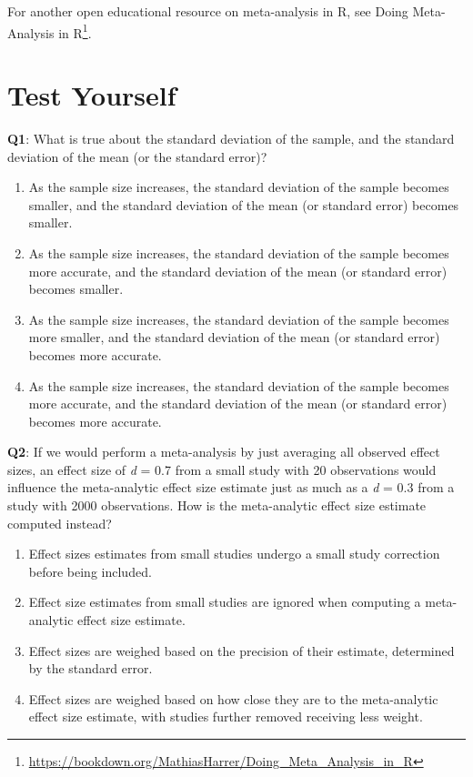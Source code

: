 \documentclass[
  oneside]{krantz}
\providecommand{\tightlist}{%
  \setlength{\itemsep}{0pt}\setlength{\parskip}{0pt}}
\renewcommand{\href}[2]{#2\footnote{\url{#1}}}
\begin{document}
For another open educational resource on meta-analysis in R, see \href{https://bookdown.org/MathiasHarrer/Doing_Meta_Analysis_in_R}{Doing Meta-Analysis in R}.

\hypertarget{test-yourself-9}{%
\section{Test Yourself}\label{test-yourself-9}}

\textbf{Q1}: What is true about the standard deviation of the sample, and the standard deviation of the mean (or the standard error)?

\begin{enumerate}
\def\labelenumi{\Alph{enumi})}
\tightlist
\item
  As the sample size increases, the standard deviation of the sample becomes smaller, and the standard deviation of the mean (or standard error) becomes smaller.
\item
  As the sample size increases, the standard deviation of the sample becomes more accurate, and the standard deviation of the mean (or standard error) becomes smaller.
\item
  As the sample size increases, the standard deviation of the sample becomes more smaller, and the standard deviation of the mean (or standard error) becomes more accurate.
\item
  As the sample size increases, the standard deviation of the sample becomes more accurate, and the standard deviation of the mean (or standard error) becomes more accurate.
\end{enumerate}

\textbf{Q2}: If we would perform a meta-analysis by just averaging all observed effect sizes, an effect size of \emph{d} = 0.7 from a small study with 20 observations would influence the meta-analytic effect size estimate just as much as a \emph{d} = 0.3 from a study with 2000 observations. How is the meta-analytic effect size estimate computed instead?

\begin{enumerate}
\def\labelenumi{\Alph{enumi})}
\tightlist
\item
  Effect sizes estimates from small studies undergo a small study correction before being included.
\item
  Effect size estimates from small studies are ignored when computing a meta-analytic effect size estimate.
\item
  Effect sizes are weighed based on the precision of their estimate, determined by the standard error.
\item
  Effect sizes are weighed based on how close they are to the meta-analytic effect size estimate, with studies further removed receiving less weight.
\end{enumerate}
\end{document}
